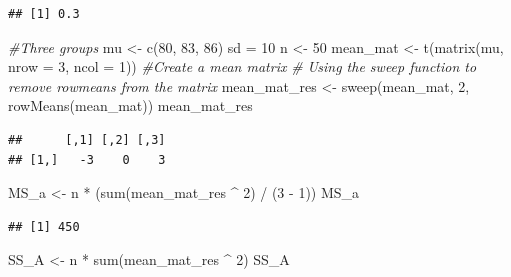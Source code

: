 \documentclass[
]{book}
\newenvironment{Shaded}{\begin{snugshade}}{\end{snugshade}}
\newcommand{\AttributeTok}[1]{\textcolor[rgb]{0.77,0.63,0.00}{#1}}
\newcommand{\CommentTok}[1]{\textcolor[rgb]{0.56,0.35,0.01}{\textit{#1}}}
\newcommand{\DecValTok}[1]{\textcolor[rgb]{0.00,0.00,0.81}{#1}}
\newcommand{\FunctionTok}[1]{\textcolor[rgb]{0.00,0.00,0.00}{#1}}
\newcommand{\NormalTok}[1]{#1}
\newcommand{\OtherTok}[1]{\textcolor[rgb]{0.56,0.35,0.01}{#1}}
\newcommand{\SpecialCharTok}[1]{\textcolor[rgb]{0.00,0.00,0.00}{#1}}
\begin{document}
\begin{verbatim}
## [1] 0.3
\end{verbatim}

\begin{Shaded}
\begin{Highlighting}[]
\CommentTok{\#Three groups}
\NormalTok{mu }\OtherTok{\textless{}{-}} \FunctionTok{c}\NormalTok{(}\DecValTok{80}\NormalTok{, }\DecValTok{83}\NormalTok{, }\DecValTok{86}\NormalTok{)}
\NormalTok{sd }\OtherTok{=} \DecValTok{10}
\NormalTok{n }\OtherTok{\textless{}{-}} \DecValTok{50}
\NormalTok{mean\_mat }\OtherTok{\textless{}{-}} \FunctionTok{t}\NormalTok{(}\FunctionTok{matrix}\NormalTok{(mu, }\AttributeTok{nrow =} \DecValTok{3}\NormalTok{, }\AttributeTok{ncol =} \DecValTok{1}\NormalTok{)) }\CommentTok{\#Create a mean matrix}
\CommentTok{\# Using the sweep function to remove rowmeans from the matrix}
\NormalTok{mean\_mat\_res }\OtherTok{\textless{}{-}} \FunctionTok{sweep}\NormalTok{(mean\_mat, }\DecValTok{2}\NormalTok{, }\FunctionTok{rowMeans}\NormalTok{(mean\_mat))}
\NormalTok{mean\_mat\_res}
\end{Highlighting}
\end{Shaded}

\begin{verbatim}
##      [,1] [,2] [,3]
## [1,]   -3    0    3
\end{verbatim}

\begin{Shaded}
\begin{Highlighting}[]
\NormalTok{MS\_a }\OtherTok{\textless{}{-}}\NormalTok{ n }\SpecialCharTok{*}\NormalTok{ (}\FunctionTok{sum}\NormalTok{(mean\_mat\_res }\SpecialCharTok{\^{}} \DecValTok{2}\NormalTok{) }\SpecialCharTok{/}\NormalTok{ (}\DecValTok{3} \SpecialCharTok{{-}} \DecValTok{1}\NormalTok{))}
\NormalTok{MS\_a}
\end{Highlighting}
\end{Shaded}

\begin{verbatim}
## [1] 450
\end{verbatim}

\begin{Shaded}
\begin{Highlighting}[]
\NormalTok{SS\_A }\OtherTok{\textless{}{-}}\NormalTok{ n }\SpecialCharTok{*} \FunctionTok{sum}\NormalTok{(mean\_mat\_res }\SpecialCharTok{\^{}} \DecValTok{2}\NormalTok{)}
\NormalTok{SS\_A}
\end{Highlighting}
\end{Shaded}
\end{document}
